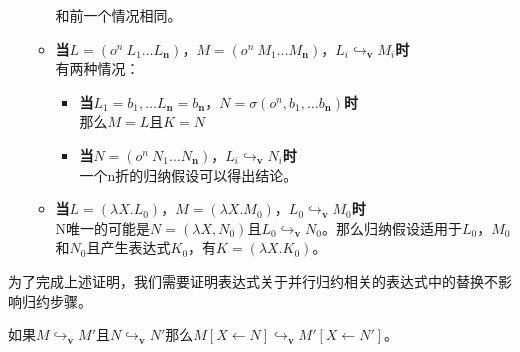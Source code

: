 \documentclass{book}
\begin{document}
\begin{adjustwidth}{20pt}{20pt}
\begin{itemize}
\begin{itemize}
  和前一个情况相同。
  \item \textbf{当}$L=(o^n\ L_1\ldots L_\textbf{n})$，$M=(o^n\ M_1\ldots M_\textbf{n})$，$ L_i\hookrightarrow_{\mathbf{v}} M_i$\textbf{时}\\
  有两种情况：
  \begin{itemize}
   \item \textbf{当}$L_1=b_1,\ldots L_\textbf{n}=b_\textbf{n}$，$N=\sigma(o^n,b_1,\ldots b_\textbf{n})$\textbf{时}\\
   那么$M=L$且$K=N$
   \item \textbf{当}$N=(o^n\ N_1\ldots N_\textbf{n})$，$L_i\hookrightarrow_{\mathbf{v}} N_i$\textbf{时}\\
   一个n折的归纳假设可以得出结论。
  \end{itemize}
  \item \textbf{当}$L=(\lambda X.L_0)$，$M=(\lambda X.M_0)$，$L_0\hookrightarrow_{\mathbf{v}} M_0$\textbf{时}\\
  N唯一的可能是$N=(\lambda X,N_0)$且$L_0\hookrightarrow_{\mathbf{v}} N_0$。那么归纳假设适用于$L_0$，$M_0$和$N_0$且产生表达式$K_0$，有$K=(\lambda X.K_0)$。
  \end{itemize}
 \end{itemize}
\end{adjustwidth}
为了完成上述证明，我们需要证明表达式关于并行归约相关的表达式中的替换不影响归约步骤。
\begin{Lemma}
 如果$M\hookrightarrow_{\mathbf{v}}M'$且$N\hookrightarrow_{\mathbf{v}}N'$那么$M[X\leftarrow N]\hookrightarrow_{\mathbf{v}} M'[X\leftarrow N']$。
\end{Lemma}
\end{document}
